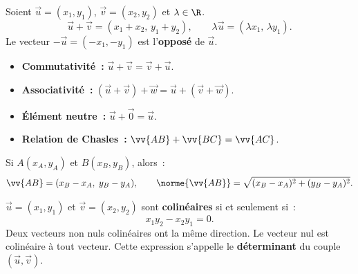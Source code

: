 \begin{defn}
Soient $\vec{u}=(x_1,y_1)$, $\vec{v}=(x_2,y_2)$ et $\lambda\in\R$.
$$\vec{u}+\vec{v} = (x_1+x_2,\, y_1+y_2),\qquad
  \lambda\vec{u} = (\lambda x_1,\, \lambda y_1).$$
Le vecteur $-\vec{u} = (-x_1,-y_1)$ est l'\textbf{oppos\'e} de $\vec{u}$.
\end{defn}

\begin{prop}
\begin{itemize}
  \item \textbf{Commutativit\'e~:} $\vec{u}+\vec{v}=\vec{v}+\vec{u}$.
  \item \textbf{Associativit\'e~:} $(\vec{u}+\vec{v})+\vec{w}=\vec{u}+(\vec{v}+\vec{w})$.
  \item \textbf{\'El\'ement neutre~:} $\vec{u}+\vec{0}=\vec{u}$.
  \item \textbf{Relation de Chasles~:} $\vv{AB}+\vv{BC}=\vv{AC}$.
\end{itemize}
\end{prop}

\begin{methode}
Si $A(x_A,y_A)$ et $B(x_B,y_B)$, alors~:
$$\vv{AB} = (x_B-x_A,\; y_B-y_A),\qquad
  \norme{\vv{AB}} = \sqrt{(x_B-x_A)^2+(y_B-y_A)^2}.$$
\end{methode}

\begin{defn}
$\vec{u}=(x_1,y_1)$ et $\vec{v}=(x_2,y_2)$ sont \textbf{colin\'eaires}
si et seulement si~:
$$x_1 y_2 - x_2 y_1 = 0.$$
Deux vecteurs non nuls colin\'eaires ont la m\^eme direction.
Le vecteur nul est colin\'eaire \`a tout vecteur.
Cette expression s'appelle le \textbf{d\'eterminant} du couple $(\vec{u},\vec{v})$.
\end{defn}

